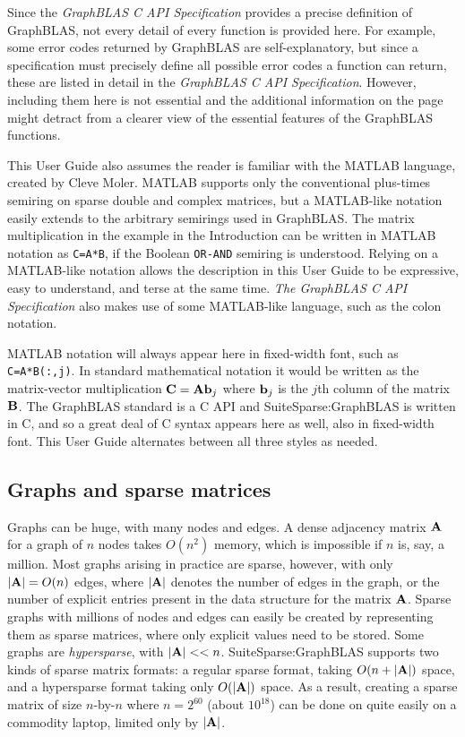 \documentclass[12pt]{article}
\begin{document}
Since the {\em GraphBLAS C API Specification} provides a precise definition of
GraphBLAS, not every detail of every function is provided here.  For example,
some error codes returned by GraphBLAS are self-explanatory, but since a
specification must precisely define all possible error codes a function can
return, these are listed in detail in the {\em GraphBLAS C API Specification}.
However, including them here is not essential and the additional information on
the page might detract from a clearer view of the essential features of the
GraphBLAS functions.

This User Guide also assumes the reader is familiar with the MATLAB language,
created by Cleve
Moler.  MATLAB supports only the conventional plus-times semiring on sparse
double and complex matrices, but a MATLAB-like notation easily extends to the
arbitrary semirings used in GraphBLAS.  The matrix multiplication in the
example in the Introduction can be written in MATLAB notation as \verb'C=A*B',
if the Boolean \verb'OR-AND' semiring is understood.  Relying on a MATLAB-like
notation allows the description in this User Guide to be expressive, easy to
understand, and terse at the same time.  {\em The GraphBLAS C API
Specification} also makes use of some MATLAB-like language, such as the colon
notation.

MATLAB notation will always appear here in fixed-width font, such as
\verb'C=A*B(:,j)'.  In standard mathematical notation it would be written as
the matrix-vector multiplication ${\bf C = A b}_j$ where ${\bf b}_j$ is the
$j$th column of the matrix ${\bf B}$.  The GraphBLAS standard is a C API and
SuiteSparse:GraphBLAS is written in C, and so a great deal of C syntax appears
here as well, also in fixed-width font.  This User Guide alternates between all
three styles as needed.

\subsection{Graphs and sparse matrices} %
\label{sparse}

Graphs can be huge, with many nodes and edges.  A dense adjacency matrix ${\bf
A}$ for a graph of $n$ nodes takes $O(n^2)$ memory, which is impossible if $n$
is, say, a million.  Most graphs arising in practice are sparse, however, with
only $|{\bf A}|=O(n)$ edges, where $|{\bf A}|$ denotes the number of edges in
the graph, or the number of explicit entries present in the data structure for
the matrix ${\bf A}$.  Sparse graphs with millions of nodes and edges can
easily be created by representing them as sparse matrices, where only explicit
values need to be stored.  Some graphs are {\em hypersparse}, with ${|\bf A}|
<< n$.  SuiteSparse:GraphBLAS supports two kinds of sparse matrix formats: a
regular sparse format, taking $O(n+|{\bf A}|)$ space, and a hypersparse format
taking only $O(|{\bf A}|)$ space.  As a result, creating a sparse matrix of
size $n$-by-$n$ where $n=2^{60}$ (about $10^{18}$) can be done on quite easily
on a commodity laptop, limited only by $|{\bf A}|$.
\end{document}
